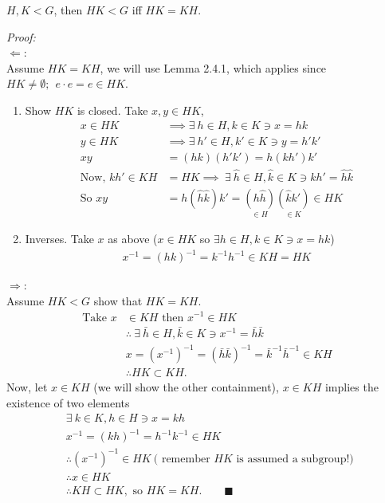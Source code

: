 \begin{lemma}
$H,K < G$, then $HK < G$ iff $HK=KH$. \steezybreak

\noindent \textit{Proof:} \\
$\Leftarrow :$ \\
Assume $HK=KH$, we will use Lemma 2.4.1, which applies since
$HK\neq \emptyset; \ \ e\cdot e = e\in HK$.
\begin{enumerate}
    \item Show $HK$ is closed. Take $x,y\in HK$,
    \begin{align}
        x\in HK &\implies \exists \ h \in H, k\in K \ni x=hk \nonumber \\
        y\in HK &\implies \exists \ h' \in H, k'\in K \ni y=h'k' \nonumber \\
        xy&=(hk)(h'k')=h(kh')k' \nonumber \\
        \text{Now, } kh'\in KH&=HK\implies \ \exists \ \hat{h}\in H, \hat{k}\in K \ni kh'=\hat{h}\hat{k} \nonumber \\
        \text{So } xy&=h(\hat{h}\hat{k})k'= \underset{\in H}{(h\hat{h})}\underset{\in K}{(\hat{k} k')} \in HK \nonumber
    \end{align}
    \item Inverses. Take $x$ as above ($x \in HK$ so $\exists h \in H, k\in K \ni x=hk$) \\
    \begin{align}
        x^{-1}=(hk)^{-1}=k^{-1}h^{-1}\in KH = HK \nonumber
    \end{align}
\end{enumerate}
$\Rightarrow :$ \\
Assume $HK<G$ show that $HK=KH$.
\begin{align}
    \text{Take }x &\in KH \text{ then }x^{-1}\in HK \nonumber\\
    &\therefore \ \exists \ \bar{h} \in H, \bar{k}\in K \ni x^{-1}=\bar{h}\bar{k} \nonumber \\
    &x=(x^{-1})^{-1}=(\bar{h}\bar{k})^{-1}=\bar{k}^{-1}\bar{h}^{-1}\in KH \nonumber \\
    &\therefore HK \subset KH. \nonumber
\end{align}
Now, let $x\in KH$ (we will show the other containment), $x\in KH$ implies the existence of two
elements
\begin{align}
    &\exists \ k \in K, h \in H \ni x= kh \nonumber\\
    &x^{-1}= (kh)^{-1}=h^{-1}k^{-1}\in HK \nonumber \\
    &\therefore (x^{-1})^{-1} \in HK \ \text{( remember $HK$ is assumed a subgroup!) } \nonumber \\
    &\therefore x \in HK \nonumber \\
    &\therefore KH\subset HK, \text{ so } HK=KH. \ \ \ \ \ \ \ \ \ \blacksquare \nonumber
\end{align}
\end{lemma}
